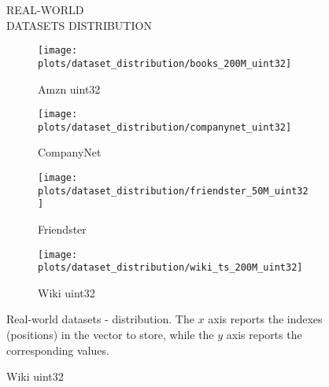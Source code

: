 \documentclass{article}
\begin{document}
\begin{figure}[!htbp]
\fbox
{
\begin{minipage}[t][0.98\textheight][t]{\textwidth}
\centering
    \vspace{20px}
    \begin{minipage}{0.95\linewidth}
    REAL-WORLD \\ DATASETS DISTRIBUTION
    \end{minipage}
    \vspace{20px}

   \begin{minipage}{0.49\linewidth}
        \begin{figure}[H]
        \texttt{[image: plots/dataset\_distribution/books\_200M\_uint32]}
        \caption{Amzn uint32}
        \end{figure}
    \end{minipage}
    \begin{minipage}{0.49\linewidth}
        \begin{figure}[H]
            \texttt{[image: plots/dataset\_distribution/companynet\_uint32]}
            \caption{CompanyNet}
        \end{figure}
    \end{minipage}

    \vfill

    \begin{minipage}{0.49\linewidth}
        \begin{figure}[H]
        \texttt{[image: plots/dataset\_distribution/friendster\_50M\_uint32]}
        \caption{Friendster}
        \end{figure}
    \end{minipage}
    \begin{minipage}{0.49\linewidth}
        \begin{figure}[H]
            \texttt{[image: plots/dataset\_distribution/wiki\_ts\_200M\_uint32]}
            \caption{Wiki uint32}
        \end{figure}
    \end{minipage}
    
    \vfill
    \centering
    \begin{minipage}{\linewidth}
    Real-world datasets - distribution. The $x$ axis reports the indexes (positions) in the vector to store, while the $y$ axis reports the corresponding values.
    \end{minipage}
    \vspace{10px}
\end{minipage}
}
\end{figure}
\end{document}
